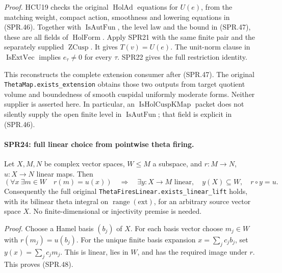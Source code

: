 \documentclass[11pt,a4paper]{article}
\numberwithin{equation}{section}
\theoremstyle{remark}\newtheorem{remark}[theorem]{Remark}
\begin{document}
\emph{Proof.}
HCU19 checks the original \(\operatorname{HolAd}\) equations
for \(U(e)\), from the matching weight, compact action,
smoothness and lowering equations in (SPR.46).
Together with \(\operatorname{IsAutFun}\), the level law and
the bound in (SPR.47), these are all fields of
\(\operatorname{HolForm}\).  Apply SPR21 with the same finite
pair and the separately supplied \(\operatorname{ZCusp}\).
It gives \(T(v)=U(e)\).  The unit-norm clause in
\(\operatorname{IsExtVec}\) implies \(e_\tau\ne0\) for every
\(\tau\).  SPR22 gives the full restriction identity.

This reconstructs the complete extension consumer after
(SPR.47).  The original \texttt{ThetaMap.\allowbreak exists\_\allowbreak extension}
obtains those two outputs from target quotient volume and
boundedness of smooth cuspidal uniformly moderate forms.
Neither supplier is asserted here.  In particular, an
\(\operatorname{IsHolCuspKMap}\) packet does not silently supply
the open finite level in \(\operatorname{IsAutFun}\); that field
is explicit in (SPR.46).

\paragraph{SPR24: full linear choice from pointwise theta firing.}
\label{claim:SPR24}
Let \(X,M,N\) be complex vector spaces, \(W\le M\) a subspace,
and \(r:M\to N\), \(u:X\to N\) linear maps.  Then
\[
 (\forall x\ \exists m\in W\quad r(m)=u(x))
 \quad\Longrightarrow\quad
 \exists y:X\to M\text{ linear},\quad
 y(X)\subseteq W,\quad r\circ y=u.
 \tag{SPR.48}
\]
Consequently the full original
\texttt{ThetaFiresLinear.\allowbreak exists\_\allowbreak linear\_\allowbreak lift} holds, with its
bilinear theta integral on \(\operatorname{range}(\mathrm{ext})\),
for an arbitrary source vector space \(X\).  No finite-dimensional
or injectivity premise is needed.

\emph{Proof.}
Choose a Hamel basis \((b_j)\) of \(X\).  For each basis vector
choose \(m_j\in W\) with \(r(m_j)=u(b_j)\).
For the unique finite basis expansion \(x=\sum_jc_jb_j\), set
\(y(x)=\sum_jc_jm_j\).  This is linear, lies in \(W\), and
has the required image under \(r\).  This proves (SPR.48).
\end{document}
